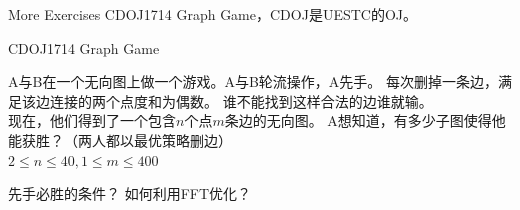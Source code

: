\documentclass[allowframebreaks,10pt]{beamer}
\begin{document}
\begin{frame}{More Exercises}
CDOJ1714 Graph Game，CDOJ是UESTC的OJ。
\end{frame}

\begin{frame}{CDOJ1714 Graph Game}
\begin{example}
A与B在一个无向图上做一个游戏。A与B轮流操作，A先手。
每次删掉一条边，满足该边连接的两个点度和为偶数。
谁不能找到这样合法的边谁就输。
\\ 现在，他们得到了一个包含$n$个点$m$条边的无向图。
A想知道，有多少子图使得他能获胜？（两人都以最优策略删边）
\\ $2 \le n \le 40, 1 \le m \le 400$
\end{example}

\pause
先手必胜的条件？
\pause
如何利用FFT优化？

\end{frame}
\end{document}
